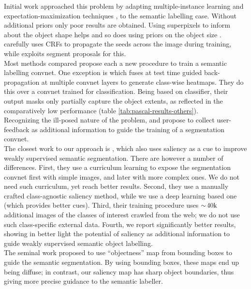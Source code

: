 \documentclass[british,10pt,twocolumn,letterpaper]{article}
\begin{document}
Initial work approached this problem by adapting multiple-instance
learning \cite{Pathak2015Iclrw} and expectation-maximization techniques
\cite{Papandreou2015Iccv}, to the semantic labelling case. Without
additional priors only poor results are obtained. Using superpixels
to inform about the object shape helps \cite{Pinheiro2015Cvpr,Xu2015CvprWeakSegmentation}
and so does using priors on the object size \cite{Pathak2015Iccv}.
\cite{kolesnikov2016seed} carefully uses CRFs to propagate the seeds
across the image during training, while \cite{Qi2016Eccv} exploits
segment proposals for this.\\
Most methods compared propose each a new procedure to train a semantic
labelling convnet. One exception is \cite{Shimoda2016Eccv} which
fuses at test time guided back-propagation \cite{Springenberg2015Iclrw}
at multiple convnet layers to generate class-wise heatmaps. They do
this over a convnet trained for classification. Being based on classifier,
their output masks only partially capture the object extents, as reflected
in the comparatively low performance (table \ref{tab:pascal-results-others}).\\
Recognizing the ill-posed nature of the problem, \cite{Kolesnikov2016Bmvc}
and \cite{Saleh2016Eccv} propose to collect user-feedback as additional
information to guide the training of a segmentation convnet.\\
The closest work to our approach is \cite{Wei2015ArXiv}, which also
uses saliency as a cue to improve weakly supervised semantic segmentation.
There are however a number of differences. First, they use a curriculum
learning to expose the segmentation convnet first with simple images,
and later with more complex ones. We do not need such curriculum,
yet reach better results. Second, they use a manually crafted class-agnostic
saliency method, while we use a deep learning based one (which provides
better cues). Third, their training procedure uses $\sim\negthinspace40\text{k}$
additional images of the classes of interest crawled from the web;
we do not use such class-specific external data. Fourth, we report
significantly better results, showing in better light the potential
of saliency as additional information to guide weakly supervised semantic
object labelling. \\
The seminal work \cite{Vezhnevets2011Iccv} proposed to use
``objectness'' map from bounding boxes to guide the semantic
segmentation. By using bounding boxes, these maps end up being
diffuse; in contrast, our saliency map has sharp object
boundaries, thus giving more precise guidance to the semantic
labeller. 
\end{document}
